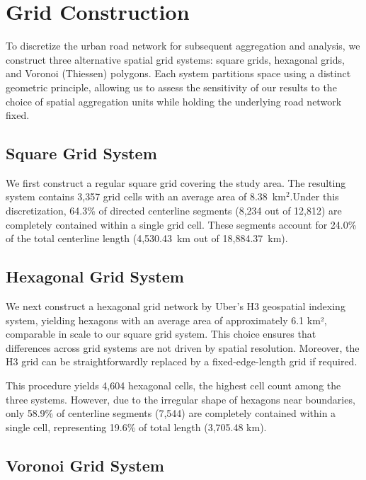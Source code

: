 \documentclass[12pt]{article}
\begin{document}
	
	
	
	
	
	
	\section{Grid Construction}
	
	To discretize the urban road network for subsequent aggregation and analysis, we construct three alternative spatial grid systems: square grids, hexagonal grids, and Voronoi (Thiessen) polygons. Each system partitions space using a distinct geometric principle, allowing us to assess the sensitivity of our results to the choice of spatial aggregation units while holding the underlying road network fixed.
	
	\subsection{Square Grid System}
	
	We first construct a regular square grid covering the study area. The resulting system contains 3,357 grid cells with an average area of 8.38~km$^2$.Under this discretization, 64.3\% of directed centerline segments (8,234 out of 12,812) are completely contained within a single grid cell. These segments account for 24.0\% of the total centerline length (4,530.43~km out of 18,884.37~km). 
	
	\subsection{Hexagonal Grid System}
	
	We next construct a hexagonal grid network by Uber's H3 geospatial indexing system, yielding hexagons with an average area of approximately 6.1 km², comparable in scale to our square grid system. This choice ensures that differences across grid systems are not driven by spatial resolution. Moreover, the H3 grid can be straightforwardly replaced by a fixed-edge-length grid if required.
	
	This procedure yields 4,604 hexagonal cells, the highest cell count among the three systems. However, due to the irregular shape of hexagons near boundaries, only 58.9\% of centerline segments (7,544) are completely contained within a single cell, representing 19.6\% of total length (3,705.48 km).
	
	\subsection{Voronoi Grid System}
	
\end{document}

